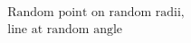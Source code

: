 \documentclass[preview]{standalone}
\begin{document}
\begin{align*}
\text{Random point on random radii,}\\ \text{line at random angle}
\end{align*}
\end{document}
